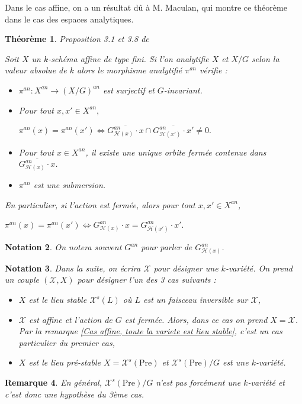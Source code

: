 \documentclass[11pt]{article}
\newcommand{\Pre}{\mathrm{Pre}}
\newtheorem{thm}{Théorème}[section]
\newtheorem{nota}[thm]{Notation}
\newtheorem{rem}[thm]{Remarque}
\begin{document}
Dans le cas affine, on a un résultat dû à M. Maculan, \cite{MaculanGIT} qui montre ce théorème dans le cas des espaces analytiques. 
\begin{thm}\label{GIT analytique} Proposition 3.1 et 3.8 de \cite{MaculanGIT}

Soit $X$ un $k$-schéma affine de type fini. Si l'on analytifie $X$ et $X/G$ selon la valeur absolue de $k$ alors le morphisme analytifié $\pi^{an}$ vérifie :
\begin{itemize}
\item $\pi^{an} : X^{an} \rightarrow (X/G)^{an}$ est surjectif et $G$-invariant.
\item Pour tout $x, x' \in X^{an},$
\begin{center}
$\pi^{an}(x) = \pi^{an}(x') \iff \overline{G^{an}_{\mathcal{H}(x)} \cdot x} \cap \overline{G^{an}_{\mathcal{H}(x')}\cdot x'} \neq 0.$
\end{center}
\item Pour tout $x \in X^{an}$, il existe une unique orbite fermée contenue dans $\overline{G^{an}_{\mathcal{H}(x)} \cdot x}$.
\item $\pi^{an}$ est une submersion.
\end{itemize}

En particulier, si l'action est fermée, alors pour tout $x, x' \in X^{an}$,
\begin{center}
$\pi^{an}(x) = \pi^{an}(x') \iff G^{an}_{\mathcal{H}(x)}\cdot x = G^{an}_{\mathcal{H}(x')}\cdot x'.$
\end{center} 
\end{thm}

\begin{nota}
On notera souvent $G^{an}$ pour parler de $G^{an}_{\mathcal{H}(x)}$. 
\end{nota}

\begin{nota}\label{Notation du lieu stable}
Dans la suite, on écrira $\mathcal{X}$ pour désigner une $k$-variété. On prend un couple $(\mathcal{X}, X)$ pour désigner l'un des 3 cas suivants :
\begin{itemize}
\item $X$ est le lieu stable $\mathcal{X}^s(L)$ où $L$ est un faisceau inversible sur $\mathcal{X}$,
\item $\mathcal{X}$ est affine et l'action de $G$ est fermée. Alors, dans ce cas on prend $X = \mathcal{X}$. Par la remarque \ref{Cas affine, toute la variete est lieu stable}, c'est un cas particulier du premier cas,
\item $X$ est le lieu pré-stable $X =\mathcal{X}^s(\Pre)$ et $\mathcal{X}^s(\Pre)/G$ est une $k$-variété.  
\end{itemize}
\end{nota}
\begin{rem}
En général, $\mathcal{X}^s(\Pre)/G$ n'est pas forcément une $k$-variété et c'est donc une hypothèse du 3ème cas.
\end{rem}
\end{document}
